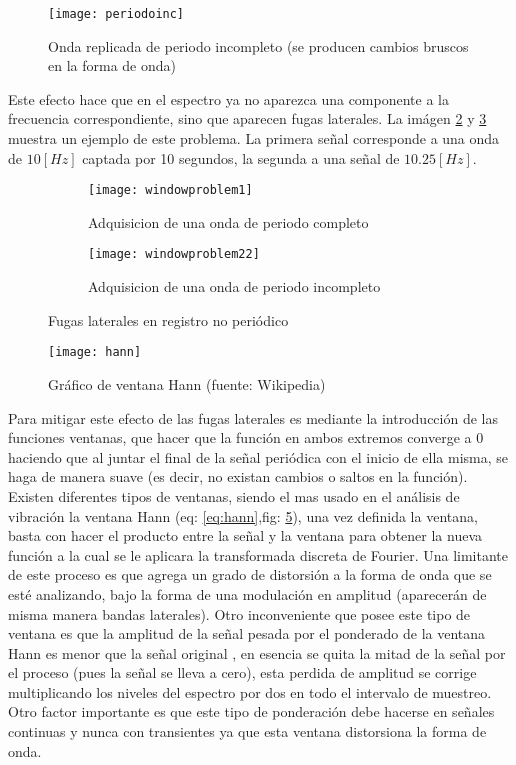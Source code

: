 				
				\begin{figure}[H]
					\centering
					\texttt{[image: periodoinc]}
					\caption{Onda replicada de periodo incompleto (se producen cambios bruscos en la forma de onda)}
					\label{fig:periodoinc}
				\end{figure}
				\newpage
				Este efecto hace que en el espectro ya no aparezca una componente a la frecuencia correspondiente, sino que aparecen fugas laterales. La imágen \ref{fig:windowing1} y \ref{fig:windowing2} muestra un ejemplo de este problema. La primera señal corresponde a una onda de $10 [Hz]$ captada por 10 segundos, la segunda a una señal de $10.25 [Hz]$.
				\begin{figure}
					\centering
					\begin{subfigure}[b]{\linewidth}
						\texttt{[image: windowproblem1]}
						\caption{Adquisicion de una onda de periodo completo}
						\label{fig:windowing1}
					\end{subfigure}
					\begin{subfigure}[b]{\linewidth}
						\texttt{[image: windowproblem22]}
						\caption{Adquisicion de una onda de periodo incompleto}
						\label{fig:windowing2}
					\end{subfigure}
					\caption{Fugas laterales en registro no periódico}
					\label{fig:comparacionfuglat}						
				\end{figure}
				\newpage
				\begin{figure}
					\centering
					\texttt{[image: hann]}
					\caption{Gráfico de ventana Hann (fuente: Wikipedia)}
					\label{fig:hannwindow}					
				\end{figure}
				Para mitigar este efecto de las fugas laterales es mediante la introducción de las funciones ventanas, que hacer que la función en ambos extremos converge a 0 haciendo que al juntar el final de la señal periódica con el inicio de ella misma, se haga de manera suave (es decir, no existan cambios o saltos en la función). Existen diferentes tipos de ventanas, siendo el mas usado en el análisis de vibración la ventana Hann (eq: \ref{eq:hann},fig: \ref{fig:hannwindow}), una vez definida la ventana, basta con hacer el producto entre la señal y la ventana para obtener la nueva función a la cual se le aplicara la transformada discreta de Fourier. Una limitante de este proceso es que agrega un grado de distorsión a la forma de onda que se esté analizando, bajo la forma de una modulación en amplitud (aparecerán de misma manera bandas laterales). Otro inconveniente que posee este tipo de ventana es que la amplitud de la señal pesada por el ponderado de la ventana Hann es menor que la señal original \cite{white2010introduction}, en esencia se quita la mitad de la señal por el proceso (pues la señal se lleva a cero), esta perdida de amplitud se corrige multiplicando los niveles del espectro por dos en todo el intervalo de muestreo. Otro factor importante es que este tipo de ponderación debe hacerse en señales continuas y nunca con transientes ya que esta ventana distorsiona la forma de onda.
